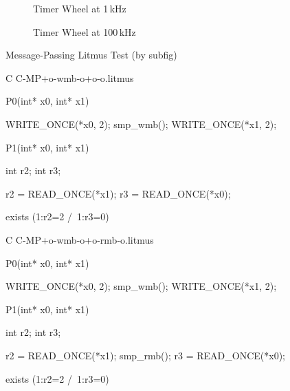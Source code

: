 \begin{figure*}[tbh]\centering
\begin{minipage}[t][][t]{2.1in}
\caption{Timer Wheel at 1\,kHz}
\label{fig:app:styleguide:Timer Wheel at 1kHz}
\end{minipage}
\qquad
\begin{minipage}[t][][t]{2.3in}
\caption{Timer Wheel at 100\,kHz}
\label{fig:app:styleguide:Timer Wheel at 100kHz}
\end{minipage}
\end{figure*}


\begin{listing*}[tbh]%
\caption{Message-Passing Litmus Test (by subfig)}%
\label{lst:app:styleguide:Message-Passing Litmus Test (subfig)}%
{\scriptsize%
\begin{verbbox}[\LstLineNo]
C C-MP+o-wmb-o+o-o.litmus

{
}

P0(int* x0, int* x1) {

  WRITE_ONCE(*x0, 2);
  smp_wmb();
  WRITE_ONCE(*x1, 2);

}

P1(int* x0, int* x1) {

  int r2;
  int r3;

  r2 = READ_ONCE(*x1);
  r3 = READ_ONCE(*x0);

}


exists (1:r2=2 /\ 1:r3=0)
\end{verbbox}
}
\centering
\hspace*{\fill}
\hspace{\fill}
{\scriptsize%
\begin{verbbox}[\LstLineNo]
C C-MP+o-wmb-o+o-rmb-o.litmus

{
}

P0(int* x0, int* x1) {

  WRITE_ONCE(*x0, 2);
  smp_wmb();
  WRITE_ONCE(*x1, 2);

}

P1(int* x0, int* x1) {

  int r2;
  int r3;

  r2 = READ_ONCE(*x1);
  smp_rmb();
  r3 = READ_ONCE(*x0);

}

exists (1:r2=2 /\ 1:r3=0)
\end{verbbox}
}%
\hspace*{\fill}%
\end{listing*}


